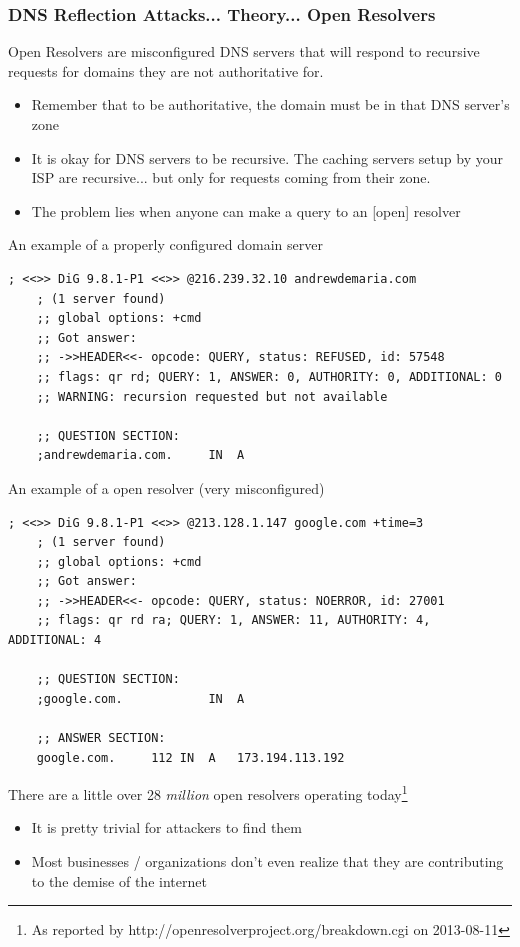 \documentclass{beamer}
\begin{document}
\begin{frame}
	\frametitle{DNS Reflection Attacks... Theory... Open Resolvers}
	Open Resolvers are misconfigured DNS servers that will respond to recursive
	requests for domains they are not authoritative for.
	\begin{itemize}
		\item Remember that to be authoritative, the domain must be in that DNS
			server's zone
		\item  It is okay for DNS servers to be recursive.  The caching servers setup by
			your ISP are recursive... but only for requests coming from their zone. 
		\item The problem lies when anyone can make a query to an [open] resolver
	\end{itemize}
	\framebreak
	An example of a properly configured domain server
	\begin{lstlisting}[breaklines]
	; <<>> DiG 9.8.1-P1 <<>> @216.239.32.10 andrewdemaria.com
	; (1 server found)
	;; global options: +cmd
	;; Got answer:
	;; ->>HEADER<<- opcode: QUERY, status: REFUSED, id: 57548
	;; flags: qr rd; QUERY: 1, ANSWER: 0, AUTHORITY: 0, ADDITIONAL: 0
	;; WARNING: recursion requested but not available

	;; QUESTION SECTION:
	;andrewdemaria.com.		IN	A
	\end{lstlisting}
	\framebreak
	An example of a open resolver (very misconfigured)
	\begin{lstlisting}[breaklines]
	; <<>> DiG 9.8.1-P1 <<>> @213.128.1.147 google.com +time=3
	; (1 server found)
	;; global options: +cmd
	;; Got answer:
	;; ->>HEADER<<- opcode: QUERY, status: NOERROR, id: 27001
	;; flags: qr rd ra; QUERY: 1, ANSWER: 11, AUTHORITY: 4, ADDITIONAL: 4

	;; QUESTION SECTION:
	;google.com.			IN	A

	;; ANSWER SECTION:
	google.com.		112	IN	A	173.194.113.192
	\end{lstlisting}
	\framebreak
	There are a little over 28 {\em million} open resolvers operating
	today\footnote{ As reported by http://openresolverproject.org/breakdown.cgi on
	2013-08-11}
	\begin{itemize}
		\item It is pretty trivial for attackers to find them
		\item Most businesses / organizations don't even realize that they are
			contributing to the demise of the internet
	\end{itemize}
\end{frame}
\end{document}

